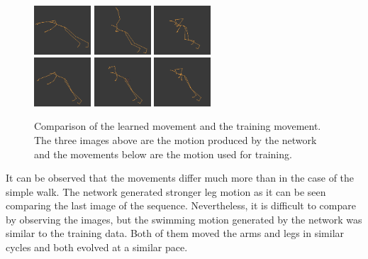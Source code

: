 \documentclass[letterpaper,9pt]{article}
\begin{document}
\begin{figure}[h!]
  \centering
  \includegraphics[width=80px]{Extra/out_swim_1.png}
  \includegraphics[width=80px]{Extra/out_swim_2.png}
  \includegraphics[width=80px]{Extra/out_swim_3.png}\\
  \includegraphics[width=80px]{Extra/teach_swim_1.png}
  \includegraphics[width=80px]{Extra/teach_swim_2.png}
  \includegraphics[width=80px]{Extra/teach_swim_3.png}
    \caption[Swimming]{Comparison of the learned movement and the training movement. The three images above are the motion produced by the network and the movements below are the motion used for training.}
\end{figure}

It can be observed that the movements differ much more than in the case of the simple walk. The network generated stronger leg motion as it can be seen comparing the last image of the sequence. Nevertheless, it is difficult to compare by observing the images, but the swimming motion generated by the network was similar to the training data. Both of them moved the arms and legs in similar cycles and both evolved at a similar pace. 
\end{document}
